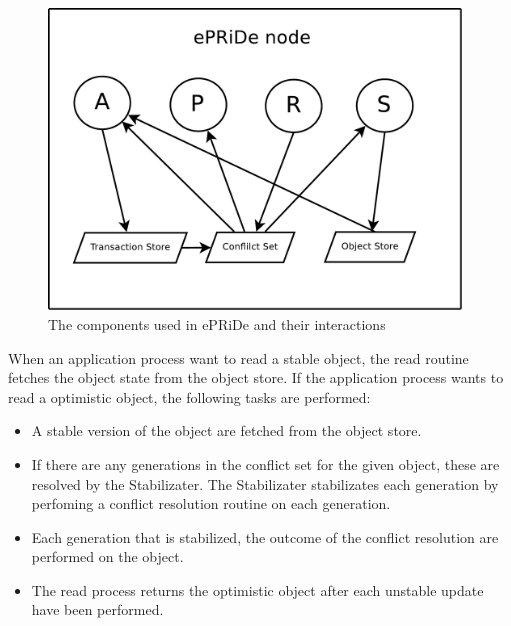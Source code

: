 \begin{figure}[htb]
\centerline{\includegraphics[height=8cm]{components.pdf}}
\caption{The components used in ePRiDe and their interactions}\label{fig:components}
\end{figure}

When an application process want to read a stable object, the read routine fetches the object state from the object store. If the application process wants to read a optimistic object, the following tasks are performed: 
\begin{itemize}
	\item A stable version of the object are fetched from the object store.
	\item If there are any generations in the conflict set for the given object, these are resolved by the Stabilizater. The Stabilizater stabilizates each generation by perfoming a conflict resolution routine on each generation. 
	\item Each generation that is stabilized, the outcome of the conflict resolution are performed on the object. 
	\item The read process returns the optimistic object after each unstable update have been performed.
\end{itemize}




%

